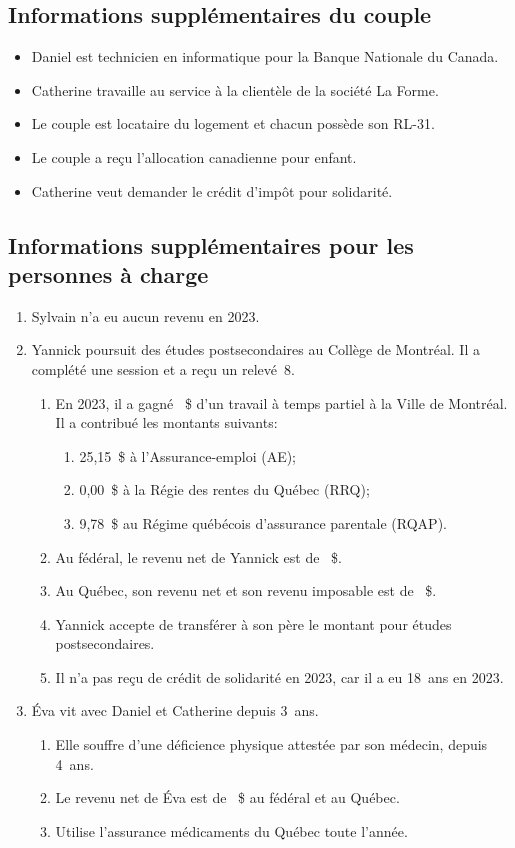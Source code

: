 \subsection{Informations supplémentaires du couple}
\begin{itemize}
	\item Daniel est technicien en informatique pour la Banque Nationale du Canada.
	\item Catherine travaille au service à la clientèle de la société La Forme.
	\item Le couple est locataire du logement et chacun possède son RL-31.
	\item Le couple a reçu l'allocation canadienne pour enfant.
	\item Catherine veut demander le crédit d'impôt pour solidarité.
\end{itemize}


\subsection{Informations supplémentaires pour les personnes à charge}
\begin{enumerate}
	\item Sylvain n'a eu aucun revenu en 2023.
	\item Yannick poursuit des études postsecondaires au Collège de Montréal. Il a complété une session et a reçu un relevé~8.
	\begin{enumerate}
		\item En 2023, il a gagné ~\$ d'un travail à temps partiel à la Ville de Montréal. Il a contribué les montants suivants:
		\begin{enumerate}
			\item 25,15~\$ à l'Assurance-emploi (AE);
			\item 0,00~\$ à la Régie des rentes du Québec (RRQ);
			\item 9,78~\$ au Régime québécois d'assurance parentale (RQAP).
		\end{enumerate}
		\item Au fédéral, le revenu net de Yannick est de ~\$.
		\item Au Québec, son revenu net et son revenu imposable est de ~\$.
		\item Yannick accepte de transférer à son père le montant pour études postsecondaires.
		\item Il n'a pas reçu de crédit de solidarité en 2023, car il a eu 18~ans en 2023.
	\end{enumerate}
	\item Éva vit avec Daniel et Catherine depuis 3~ans.
	\begin{enumerate}
		\item Elle souffre d'une déficience physique attestée par son médecin, depuis 4~ans.
		\item Le revenu net de Éva est de ~\$ au fédéral et au Québec.
		\item Utilise l'assurance médicaments du Québec toute l'année.
	\end{enumerate}
\end{enumerate}


